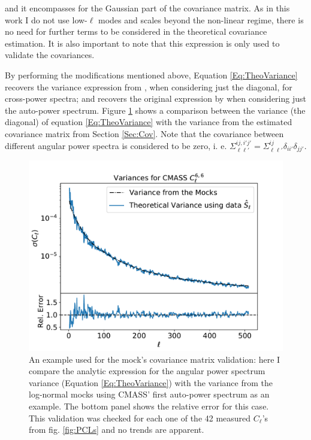 and it encompasses for the Gaussian part of the covariance matrix. As in this work I do not use low-$\ell$ modes and scales beyond the non-linear regime, there is no need for further terms to be considered in the theoretical covariance estimation. It is also important to note that this expression is only used to validate the \flask covariances.

\qquad By performing the modifications mentioned above, Equation \eqref{Eq:TheoVariance} recovers the variance expression from \cite{Rassat2007}, when considering just the diagonal, for cross-power spectra; and recovers the original expression by \cite{2008DahlenSimons} when considering just the auto-power spectrum. Figure \ref{fig:Mocks_Variance} shows a comparison between the variance (the diagonal) of equation \eqref{Eq:TheoVariance} with the variance from the estimated covariance matrix from Section \ref{Sec:Cov}. Note that the covariance between different angular power spectra is considered to be zero, i. e. $\Sigma^{ij,i'j'}_{\ell\ell'} = \Sigma^{ij}_{\ell\ell'} \delta_{ii'}\delta_{jj'}$.

\begin{figure}
\begin{center}
\includegraphics[scale=0.55]{BOSS-FIGS/MocksValidation.pdf}
\caption[Mock's covariance matrix validation.]{An example used for the mock's covariance matrix validation: here I compare the analytic expression for the angular power spectrum variance (Equation \eqref{Eq:TheoVariance}) with the variance from the log-normal mocks using CMASS' first auto-power spectrum as an example. The bottom panel shows the relative error for this case. This validation was checked for each one of the 42 measured $C_{\ell}$'s from fig. \ref{fig:PCLs} and no trends are apparent.}
\label{fig:Mocks_Variance}
\end{center}
\end{figure}

